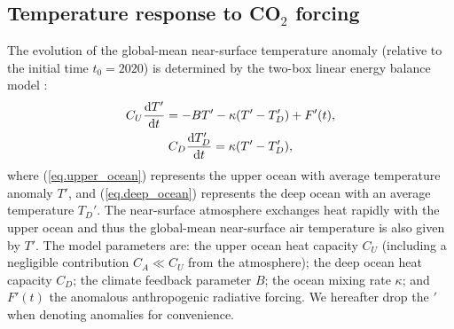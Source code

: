 \documentclass{article}
\begin{document}
\subsection{Temperature response to CO$_{2}$ forcing}
The evolution of the global-mean near-surface temperature anomaly (relative to the initial time $t_{0} = 2020$) is determined by the two-box linear energy balance model \citep[e.g][]{gregory_vertical_2000, held_probing_2010}:
\begin{gather}
    C_{U} \dv{T'}{t} = -B T' - \kappa( T' - T_{D}') + F'(t), \label{eq.upper_ocean}
    \\
    C_{D} \dv{T_{D}'}{t} = \kappa (T' - T_{D}'),\label{eq.deep_ocean}
\end{gather}
where (\ref{eq.upper_ocean}) represents the upper ocean with average temperature anomaly $T'$, and (\ref{eq.deep_ocean}) represents the deep ocean with an average temperature $T_{D}'$. The near-surface atmosphere exchanges heat rapidly with the upper ocean and thus the global-mean near-surface air temperature is also given by $T'$. The model parameters are: the upper ocean heat capacity $C_{U}$ (including a negligible contribution $C_{A} \ll C_{U}$ from the atmosphere); the deep ocean heat capacity $C_{D}$; the climate feedback parameter $B$; the ocean mixing rate $\kappa$; and $F'(t)$ the anomalous anthropogenic radiative forcing. We hereafter drop the $'$ when denoting anomalies for convenience.
\end{document}
